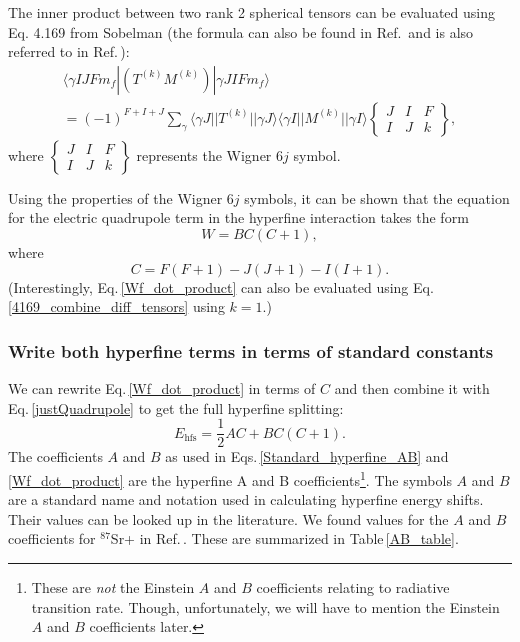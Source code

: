 The inner product between two rank 2 spherical tensors can be evaluated using Eq. 4.169 from Sobelman \cite{sobelman_spectra} (the formula can also be found in Ref.\,\cite{Racah2} and is also referred to in Ref.\,\cite{schwartz_hyperfine_expansion}):
\begin{multline}\label{4169_combine_diff_tensors}
\langle\gamma I J F m_f|(T^{(k)}M^{(k)})|\gamma J I F m_f\rangle \\
=
(-1)^{F+I+J} \sum_{\gamma} \langle\gamma J||T^{(k)}||\gamma J\rangle
\langle\gamma I || M^{(k)} ||\gamma I\rangle
\begin{Bmatrix}
J & I & F \\
I & J & k
\end{Bmatrix},
\end{multline}
where 
$\begin{Bmatrix}
J & I & F \\
I & J & k
\end{Bmatrix}$ represents the Wigner $6j$ symbol. 

Using the properties of the Wigner $6j$ symbols, it can be shown that %
the equation for the electric quadrupole term in the hyperfine interaction takes the form \cite{cuaMITnotes}\cite{sobelman_spectra} 
\begin{equation}\label{justQuadrupole}
W=BC(C+1),
\end{equation}
where 
\begin{equation}
C=F(F+1)-J(J+1)-I(I+1).
\end{equation}
(Interestingly, Eq.\,\ref{Wf_dot_product} can also be evaluated using Eq.\,\ref{4169_combine_diff_tensors} using $k=1$.)

\subsubsection{Write both hyperfine terms in terms of standard constants}
We can rewrite Eq.\,\eqref{Wf_dot_product} in terms of $C$ 
and then combine it with Eq.\,\eqref{justQuadrupole} to get the full hyperfine splitting\cite{cuaMITnotes}: 
\begin{equation}\label{Standard_hyperfine_AB}
E_{\mathrm{hfs}}=\frac{1}{2}AC+BC(C+1).
\end{equation}
The coefficients $A$ and $B$ as used in Eqs.\,\ref{Standard_hyperfine_AB} and \ref{Wf_dot_product} are the hyperfine A and B coefficients\footnote{These are \emph{not} the Einstein $A$ and $B$ coefficients relating to radiative transition rate. Though, unfortunately, we will have to mention the Einstein $A$ and $B$ coefficients later.}. The symbols $A$ and $B$ are a standard name and notation used in calculating hyperfine energy shifts. Their values can be looked up in the literature\cite{cuaMITnotes}.  We found values for the $A$ and $B$ coefficients for $^{87}$Sr+ in Ref.\,\cite{safronova2photon}. These are summarized in Table\,\ref{AB_table}.  

